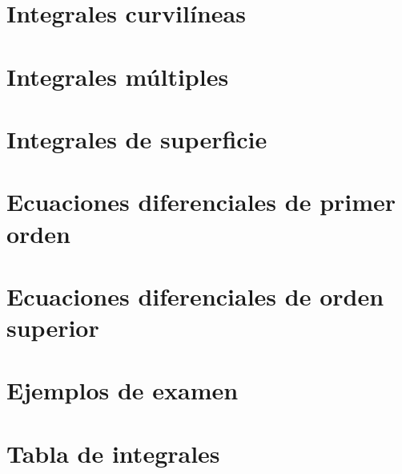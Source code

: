 \documentclass[a4paper, 12pt, oneside, titlepage, openany]{book}
\begin{document}
\tableofcontents

\chapter{Integrales curvil\'ineas}


\chapter{Integrales m\'ultiples}

 
\chapter{Integrales de superficie}


\chapter{Ecuaciones diferenciales de primer orden}

 
\chapter{Ecuaciones diferenciales de orden superior}


\chapter{Ejemplos de examen}


\appendix
\chapter{Tabla de integrales}





\listoffigures
\listoftables
\end{document}
